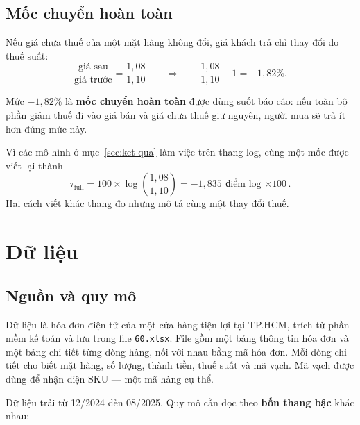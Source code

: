 \documentclass[11pt]{article}
\newcommand{\dvi}{điểm log $\times$100}
\begin{document}
\subsection{Mốc chuyển hoàn toàn}
\label{sec:moc-chuyen}

Nếu giá chưa thuế của một mặt hàng không đổi, giá khách trả chỉ thay đổi do thuế suất:
\begin{equation}
  \frac{\text{giá sau}}{\text{giá trước}} = \frac{1{,}08}{1{,}10}
  \qquad\Longrightarrow\qquad
  \frac{1{,}08}{1{,}10} - 1 = -1{,}82\%.
  \label{eq:moc-phan-tram}
\end{equation}

Mức $-1{,}82\%$ là \textbf{mốc chuyển hoàn toàn} được dùng suốt báo cáo: nếu toàn bộ phần giảm
thuế đi vào giá bán và giá chưa thuế giữ nguyên, người mua sẽ trả ít hơn đúng mức này.

Vì các mô hình ở mục~\ref{sec:ket-qua} làm việc trên thang log, cùng một mốc được viết lại thành
\begin{equation}
  \tau_{\text{full}} = 100 \times \log\!\left(\frac{1{,}08}{1{,}10}\right) = -1{,}835 \ \text{\dvi}.
  \label{eq:moc-log}
\end{equation}
Hai cách viết khác thang đo nhưng mô tả cùng một thay đổi thuế.

\section{Dữ liệu}

\subsection{Nguồn và quy mô}

Dữ liệu là hóa đơn điện tử của một cửa hàng tiện lợi tại TP.HCM, trích từ phần mềm kế toán và lưu
trong file \texttt{60.xlsx}. File gồm một bảng thông tin hóa đơn và một bảng chi tiết từng dòng
hàng, nối với nhau bằng mã hóa đơn. Mỗi dòng chi tiết cho biết mặt hàng, số lượng, thành tiền,
thuế suất và mã vạch. Mã vạch được dùng để nhận diện SKU --- một mã hàng cụ thể.

Dữ liệu trải từ 12/2024 đến 08/2025. Quy mô cần đọc theo \textbf{bốn thang bậc} khác nhau:
\end{document}
